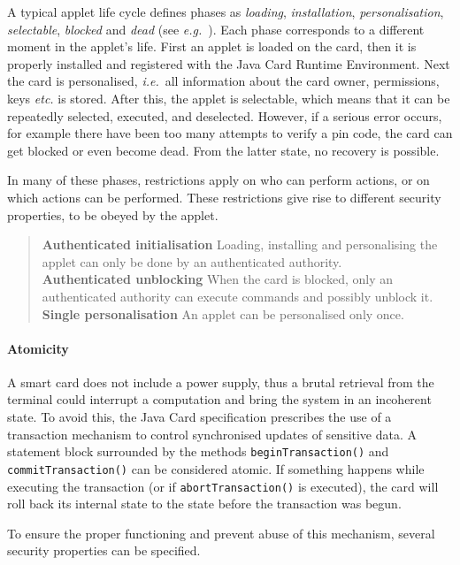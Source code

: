 A typical applet life cycle defines phases as {\it loading},
{\it installation}, {\it personalisation}, {\it selectable},
{\it blocked} and {\it dead}
(see \emph{e.g.}~\/\cite{MarletL01}).  Each phase corresponds to a
different moment in the applet's life. First an applet is loaded on
the card, then it is properly installed and registered with the Java
Card Runtime Environment. Next the card is personalised,
\emph{i.e.}~all information about the card owner, permissions, keys
\emph{etc.} is stored. After this, the applet is selectable, which means
that it can be repeatedly selected, executed, and deselected. However,
if a serious error occurs, for example there
have been too many attempts to verify a pin code, the card can get
blocked or even become dead. From the latter state, no recovery is
possible.

In many of these phases, restrictions apply on who can perform
actions, or on which actions can be performed. These restrictions give
rise to different security properties, to be obeyed by the applet.

\begin{quote}
\textbf{Authenticated initialisation} Loading, installing and 
personalising the applet can only be done by an authenticated
authority.\smallskip\\
\textbf{Authenticated unblocking} When the card is blocked,
only an authenticated authority can execute commands and possibly
unblock it.\smallskip\\
\textbf{Single personalisation} An applet can be
personalised only once.
\end{quote}


\paragraph {Atomicity}

A smart card does not include a power supply, thus a brutal retrieval
from the terminal could interrupt a computation and bring the system in
an incoherent state. To avoid this, the Java Card
specification prescribes the use of a transaction mechanism to
control synchronised updates of sensitive data. A 
statement block surrounded by the methods \texttt{beginTransaction()} and
\texttt{commitTransaction()} can be considered atomic.
If something happens while executing the transaction (or if
\texttt{abortTransaction()} is executed), the card will
roll back its internal state to the state before the transaction was
begun.

To ensure the proper functioning and prevent abuse of this mechanism,
several security properties can be specified.


